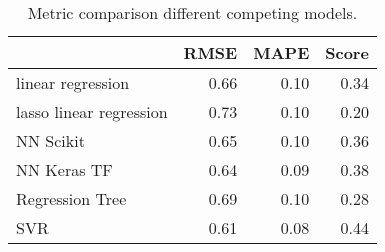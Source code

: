 \begin{table}[h!]
\centering
\caption{Metric comparison different competing models.}
\label{tab:model_results}
\begin{tabular}{lrrr}
\toprule
{} &  RMSE &  MAPE &  Score \\
\midrule
linear regression       &  0.66 &  0.10 &   0.34 \\
lasso linear regression &  0.73 &  0.10 &   0.20 \\
NN Scikit               &  0.65 &  0.10 &   0.36 \\
NN Keras TF             &  0.64 &  0.09 &   0.38 \\
Regression Tree         &  0.69 &  0.10 &   0.28 \\
SVR                     &  0.61 &  0.08 &   0.44 \\
\bottomrule
\end{tabular}
\end{table}

